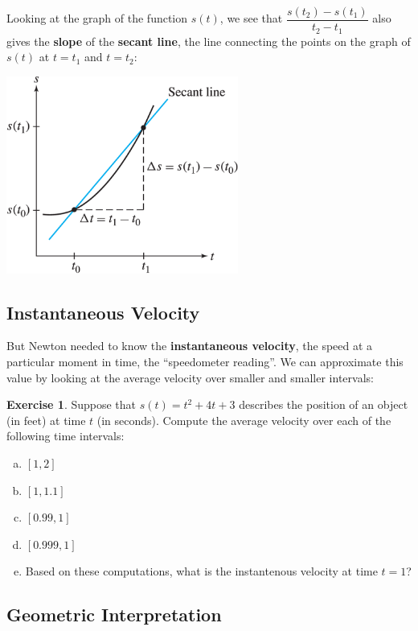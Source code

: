 \documentclass[11pt,reqno,final]{amsart}
\numberwithin{equation}{section}
\numberwithin{figure}{section}
\theoremstyle{definition} %
\newtheorem{exercise}[question]{Exercise}
\begin{document}
Looking at the graph of the function $s(t)$, we see that $\dfrac{s(t_2) - s(t_1)}{t_2-t_1}$ also gives the \textbf{slope} of the
\textbf{secant line}, the line connecting the points on the graph of $s(t)$ at $t=t_1$ and $t=t_2$:
\begin{center}
        \includegraphics[width=3in]{09-16P-sec.png}
\end{center}

\newpage

\subsection{Instantaneous Velocity}

But Newton needed to know the \textbf{instantaneous velocity}, the speed at a particular moment in time, the ``speedometer reading''.
We can approximate this value by looking at the average velocity over smaller and smaller intervals:
\begin{exercise}
        \label{EX1}
        Suppose that $s(t) = t^2 + 4t+3$ describes the position of an object (in feet) at time $t$ (in seconds).
        Compute the average velocity over each of the following time intervals:
        \begin{enumerate}[(a)]
        \item $[1,2]$
                \vfill
        \item $[1,1.1]$
                \vfill
        \item $[0.99,1]$
                \vfill
        \item $[0.999, 1]$
                \vfill
        \item Based on these computations, what is the instantenous velocity at time $t = 1$?
                \vfill
        \end{enumerate}
\end{exercise}

\subsection{Geometric Interpretation}
\end{document}

